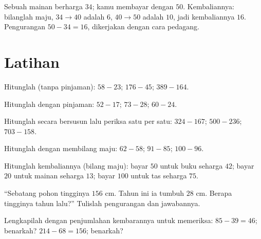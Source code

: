 \begin{example}\label{ex:g2:subtraction:change}
Sebuah mainan berharga $34$; kamu membayar dengan $50$.
Kembaliannya: bilanglah maju, $34 \to 40$ adalah $6$, $40 \to 50$
adalah $10$, jadi kembaliannya $16$. Pengurangan $50 - 34 = 16$,
dikerjakan dengan cara pedagang.
\end{example}

\section{Latihan}

\begin{exercise}[$\star$]\label{exo:g2:subtraction:1}
Hitunglah (tanpa pinjaman): $58 - 23$; \quad $176 - 45$; \quad
$389 - 164$.
\end{exercise}

\begin{exercise}[$\star$]\label{exo:g2:subtraction:2}
Hitunglah dengan pinjaman: $52 - 17$; \quad $73 - 28$; \quad
$60 - 24$.
\end{exercise}

\begin{exercise}[$\star$]\label{exo:g2:subtraction:3}
Hitunglah secara bersusun lalu periksa satu per satu: $324 - 167$;
\quad $500 - 236$; \quad $703 - 158$.
\end{exercise}

\begin{exercise}[$\star$]\label{exo:g2:subtraction:4}
Hitunglah dengan membilang maju: $62 - 58$; \quad $91 - 85$; \quad
$100 - 96$.
\end{exercise}

\begin{exercise}[$\star$]\label{exo:g2:subtraction:5}
Hitunglah kembaliannya (bilang maju): bayar $50$ untuk buku seharga
$42$; bayar $20$ untuk mainan seharga $13$; bayar $100$ untuk tas seharga $75$.
\end{exercise}

\begin{exercise}[$\star$]\label{exo:g2:subtraction:6}
``Sebatang pohon tingginya $156$ cm. Tahun ini ia tumbuh $28$ cm.
Berapa tingginya tahun lalu?'' Tulislah pengurangan dan jawabannya.
\end{exercise}

\begin{exercise}[$\star$]\label{exo:g2:subtraction:7}
Lengkapilah dengan penjumlahan kembarannya untuk memeriksa:
$85 - 39 = 46$; benarkah? $214 - 68 = 156$; benarkah?
\end{exercise}

